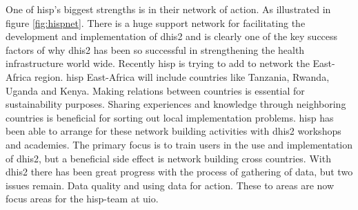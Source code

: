 One of \gls{hisp}'s biggest strengths is in their network of action. As illustrated in figure \ref{fig:hispnet}. There is a huge support network for facilitating the development and implementation of \gls{dhis2} and is clearly one of the key success factors of why \gls{dhis2} has been so successful in strengthening the health infrastructure world wide. Recently \gls{hisp} is trying to add to network the East-Africa region. \gls{hisp} East-Africa will include countries like Tanzania, Rwanda, Uganda and Kenya. Making relations between countries is essential for sustainability purposes. Sharing experiences and knowledge through neighboring countries is beneficial for sorting out local implementation problems. \gls{hisp} has been able to arrange for these network building activities with \gls{dhis2} workshops and academies. The primary focus is to train users in the use and implementation of \gls{dhis2}, but a beneficial side effect is network building cross countries. 
With \gls{dhis2} there has been great progress with the process of gathering of data, but two issues remain. Data quality and using data for action. These to areas are now focus areas for the \gls{hisp}-team at \gls{uio}.

\cite{strategyhisp:uio}
\cite{networkhisp:uio}
\cite{jbemss:noa}


